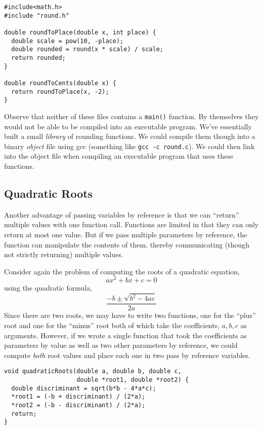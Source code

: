 \begin{verbatim}
#include<math.h>
#include "round.h"

double roundToPlace(double x, int place) {
  double scale = pow(10, -place);
  double rounded = round(x * scale) / scale;
  return rounded;
}

double roundToCents(double x) {
  return roundToPlace(x, -2);
}
\end{verbatim}

Observe that neither of these files contains a \texttt{main()}
function.  By themselves they would not be able to be compiled
into an executable program.  We've essentially built a small 
\emph{library} of rounding functions.  We could compile them though
into a binary \emph{object} file using gcc (something like 
\texttt{gcc -c round.c}).  We could then link into the object
file when compiling an executable program that uses these functions.

\subsection{Quadratic Roots}
\label{subsection:c:quadraticRoots}

Another advantage of passing variables by reference is that we
can ``return'' multiple values with one function call.  Functions
are limited in that they can only return at most one value.  But
if we pass multiple parameters by reference, the function can
manipulate the contents of them, thereby communicating (though
not strictly returning) multiple values.  

Consider again the problem of computing the roots of a quadratic
equation, 
  $$ax^2 + bx + c = 0$$
using the quadratic formula,
 $$\frac{-b \pm \sqrt{b^2 - 4ac}}{2a}$$
Since there are two roots, we may have to write two functions, 
one for the ``plus'' root and one for the ``minus'' root both of 
which take the coefficients, $a, b, c$ as arguments.  However,
if we wrote a single function that took the coefficients as parameters
by value as well as two other parameters by reference, we could
compute \emph{both} root values and place each one in two pass 
by reference variables.

\begin{verbatim}
void quadraticRoots(double a, double b, double c, 
                    double *root1, double *root2) {
  double discriminant = sqrt(b*b - 4*a*c);
  *root1 = (-b + discriminant) / (2*a);
  *root2 = (-b - discriminant) / (2*a);
  return;
}
\end{verbatim}

